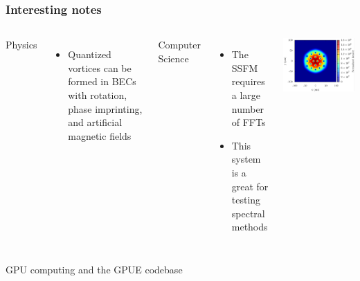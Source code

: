 \documentclass{beamer}
\begin{document}
\begin{frame}
\frametitle{Interesting notes}
\begin{columns}
\hspace{0.25cm} 
Physics
\begin{itemize}
\item Quantized vortices can be formed in BECs with rotation, phase imprinting, and artificial magnetic fields
\end{itemize}

Computer Science
\begin{itemize}
\item The SSFM requires a large number of FFTs
\item This system is a great for testing spectral methods
\end{itemize}
\hspace{-0.3cm} 
 \includegraphics[width=1\textwidth]{../data/splitop/rot/density_L10.pdf}
\end{columns}

\end{frame}

\begin{frame}
\center \huge GPU computing and the GPUE codebase
\end{frame}
\end{document}
